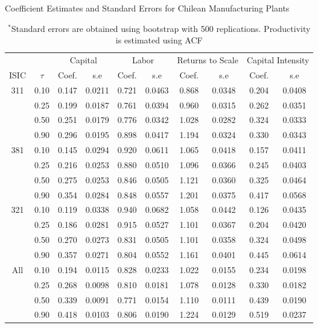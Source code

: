 \documentclass[11pt]{article}
\begin{document}
\begin{table}[H]
\centering
\caption{Coefficient Estimates and Standard Errors for Chilean Manufacturing Plants}
\begin{tabular}{cccccccccc}
  \hline\hline & & \multicolumn{2}{c}{Capital}  & \multicolumn{2}{c}{Labor} & \multicolumn{2}{c}{Returns to Scale} & \multicolumn{2}{c}{Capital Intensity}\\ \cmidrule(lr){3-4} \cmidrule(lr){5-6} \cmidrule(lr){7-8} \cmidrule(lr){9-10}ISIC & $\tau$ & Coef. & s.e & Coef. & s.e & Coef. & s.e & Coef. & s.e \\ 
  \hline
311 & 0.10 & 0.147 & 0.0211 & 0.721 & 0.0463 & 0.868 & 0.0348 & 0.204 & 0.0408 \\ 
   & 0.25 & 0.199 & 0.0187 & 0.761 & 0.0394 & 0.960 & 0.0315 & 0.262 & 0.0351 \\ 
   & 0.50 & 0.251 & 0.0179 & 0.776 & 0.0342 & 1.028 & 0.0282 & 0.324 & 0.0333 \\ 
   & 0.90 & 0.296 & 0.0195 & 0.898 & 0.0417 & 1.194 & 0.0324 & 0.330 & 0.0343 \\ 
  381 & 0.10 & 0.145 & 0.0294 & 0.920 & 0.0611 & 1.065 & 0.0418 & 0.157 & 0.0411 \\ 
   & 0.25 & 0.216 & 0.0253 & 0.880 & 0.0510 & 1.096 & 0.0366 & 0.245 & 0.0403 \\ 
   & 0.50 & 0.275 & 0.0253 & 0.846 & 0.0505 & 1.121 & 0.0360 & 0.325 & 0.0464 \\ 
   & 0.90 & 0.354 & 0.0284 & 0.848 & 0.0557 & 1.201 & 0.0375 & 0.417 & 0.0568 \\ 
  321 & 0.10 & 0.119 & 0.0338 & 0.940 & 0.0682 & 1.058 & 0.0442 & 0.126 & 0.0435 \\ 
   & 0.25 & 0.186 & 0.0281 & 0.915 & 0.0527 & 1.101 & 0.0367 & 0.204 & 0.0420 \\ 
   & 0.50 & 0.270 & 0.0273 & 0.831 & 0.0505 & 1.101 & 0.0358 & 0.324 & 0.0498 \\ 
   & 0.90 & 0.357 & 0.0271 & 0.804 & 0.0552 & 1.161 & 0.0401 & 0.445 & 0.0614 \\ 
  All & 0.10 & 0.194 & 0.0115 & 0.828 & 0.0233 & 1.022 & 0.0155 & 0.234 & 0.0198 \\ 
   & 0.25 & 0.268 & 0.0098 & 0.810 & 0.0181 & 1.078 & 0.0128 & 0.330 & 0.0182 \\ 
   & 0.50 & 0.339 & 0.0091 & 0.771 & 0.0154 & 1.110 & 0.0111 & 0.439 & 0.0190 \\ 
   & 0.90 & 0.418 & 0.0103 & 0.806 & 0.0190 & 1.224 & 0.0129 & 0.519 & 0.0237 \\ 
   \hline
\end{tabular}
\caption*{\footnotesize $^{*}$Standard errors are obtained using bootstrap with 500 replications. Productivity is estimated using ACF}
\label{CHLestACF}
\end{table}
\end{document}

